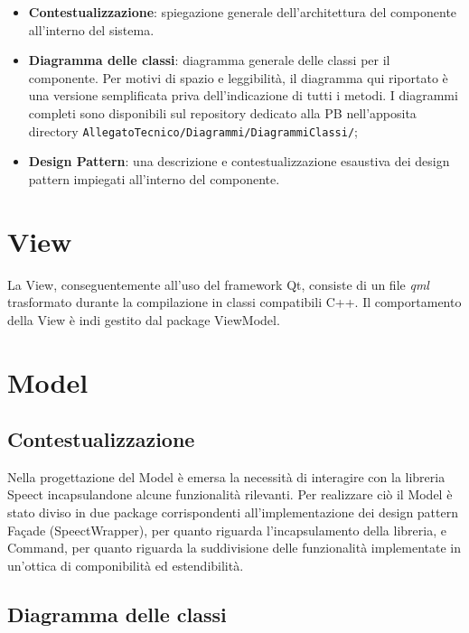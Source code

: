 \documentclass[openany,12pt,a4paper]{report}
\begin{document}
	\begin{itemize}
		\item \textbf{Contestualizzazione}: spiegazione generale dell'architettura del componente all'interno del sistema.
		\item \textbf{Diagramma delle classi}: diagramma generale delle classi per il componente. Per motivi di spazio e leggibilità, il diagramma qui riportato è una versione semplificata priva dell'indicazione di tutti i metodi. I diagrammi completi sono disponibili sul repository dedicato alla PB nell'apposita directory \verb|AllegatoTecnico/Diagrammi/DiagrammiClassi/|;
		\item \textbf{Design Pattern}: una descrizione e contestualizzazione esaustiva dei design pattern impiegati all'interno del componente.
	\end{itemize} 
	
	\section{View}
	
	La View, conseguentemente all’uso del framework Qt, consiste di un file \textit{qml} trasformato durante la compilazione in classi compatibili C++. Il comportamento della View è indi gestito dal package ViewModel. 
	
	\section{Model}
	
	\subsection{Contestualizzazione}
	
	Nella progettazione del Model è emersa la necessità di interagire con la libreria Speect incapsulandone alcune funzionalità rilevanti. Per realizzare ciò il Model è stato diviso in due package corrispondenti all'implementazione dei design pattern Façade (SpeectWrapper), per quanto riguarda l'incapsulamento della libreria, e Command, per quanto riguarda la suddivisione delle funzionalità implementate in un'ottica di componibilità ed estendibilità.  
	
	\subsection{Diagramma delle classi}
	
\end{document}
